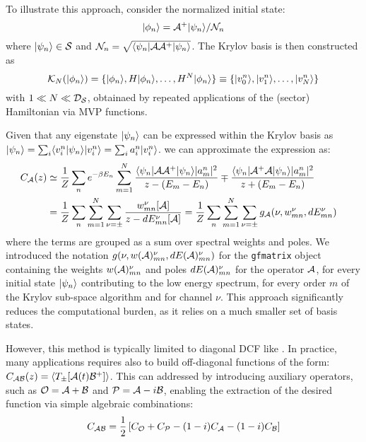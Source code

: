 \documentclass[edipack2.tex]{subfiles}
\begin{document}
To illustrate this approach, consider the normalized initial state: 
$$
\ket{\phi_n}=\AA^+\ket{\psi_n}/\NN_n
$$
where  $\ket{\psi_n}\in\SS$ and $\NN_n=\sqrt{\bra{\psi_n}\AA
  \AA^+\ket{\psi_n}}$.
The Krylov basis is then constructed as $$\mathcal{K}_{N} (\ket{\phi_n})=\{\ket{\phi_n}, H\ket{\phi_n}, \dots,
H^N\ket{\phi_n}\}\equiv \{\ket{v^n_0}, \ket{v^n_1},\dots, \ket{v^n_N}
\}$$ with $1 \ll N \ll \DD_\SS$, obtainaed by repeated applications of
the (sector) Hamiltonian via MVP functions.

Given that any eigenstate $\ket{\psi_n}$ can be expressed within the
Krylov basis as
$\ket{\psi_n} = \sum_i  \ibra v^n_i|\psi_n \iket  \ket{ v^n_i} =
\sum_i a^n_i \ket{v^n_i}$. we can approximate the expression
 as:  
\begin{equation}
  \label{eqGKrylov}
  \begin{split}
    C_\AA(z)  &\simeq \frac{1}{Z}\sum_n e^{-\beta E_n}
    \sum_{m=1}^{N} \frac{\bra{\psi_n}\AA \AA^+\ket{\psi_n} |a^n_m|^2}{
      z - (E_m-E_n)} \mp \frac{\bra{\psi_n}\AA^+ \AA\ket{\psi_n}
      |a^n_m|^2}{ z + (E_m-E_n)}\cr
    &= \frac{1}{Z}\sum_n\sum_{m=1}^{N} \sum_{\nu=\pm}\frac{w^{\nu}_{mn}[\AA]}{z - dE^\nu_{mn}[\AA]} 
    = \frac{1}{Z}\sum_n
    \sum_{m=1}^{N} \sum_{\nu=\pm} g_\AA(\nu, w^{\nu}_{mn},  dE^\nu_{mn}) \cr
  \end{split}
\end{equation}
where the terms are grouped as a sum over spectral weights and
poles. We introduced the notation $g(\nu, w(\AA)^{\nu}_{mn},  dE(\AA)^\nu_{mn})$
for the {\tt gfmatrix} object containing the weights $w(\AA)^{\nu}_{mn}$ and
poles $dE(\AA)^{\nu}_{mn}$ for the operator $\AA$, for every initial state $\ket{\psi_n}$
contributing to the low energy spectrum, for every order $m$ of the
Krylov sub-space algorithm and for channel $\nu$.
This approach significantly reduces the computational burden, as it
relies on a much smaller set of basis states.


However, this method is typically limited to diagonal DCF like
. In practice, many applications requires also to build off-diagonal
functions of the form:
$C_{\AA\BB}(z) = \ibra T_{\pm}[\AA(t) \BB^+]\iket$.
This can addressed by introducing auxiliary operators, such as $\OO=\AA +\BB$ and
$\PP=\AA-i\BB$, enabling the extraction of the desired function via
simple algebraic combinations:
$$
C_{\AA\BB} = \frac{1}{2}\left[C_\OO + C_\PP - (1-i)C_\AA -(1-i)C_\BB\right]
$$
\end{document}
